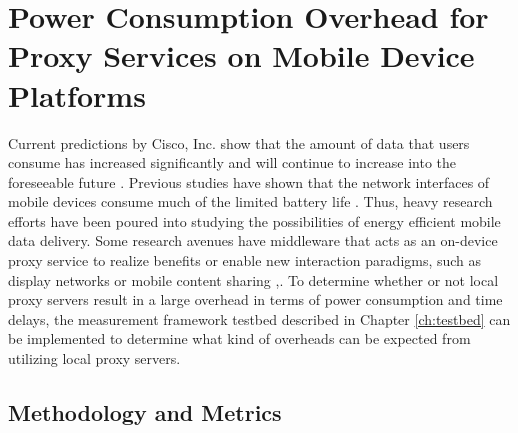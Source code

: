 \chapter{Power Consumption Overhead for Proxy Services on Mobile Device Platforms}

Current predictions by Cisco, Inc. show that the amount of data that users consume has increased significantly and will continue to increase into the foreseeable future \cite{VNI14}. Previous studies have shown that the network interfaces of mobile devices consume much of the limited battery life \cite{Carroll:2010:APC:1855840.1855861}. Thus, heavy research efforts have been poured into studying the possibilities of energy efficient mobile data delivery. Some research avenues have middleware that acts as an on-device proxy service to realize benefits or enable new interaction paradigms, such as display networks \cite{6174992} or mobile content sharing \cite{Seeling:2014:OES:2671189.2671194},\cite{6692468}. To determine whether or not local proxy servers result in a large overhead in terms of power consumption and time delays, the measurement framework testbed described in Chapter \ref{ch:testbed} can be implemented to determine what kind of overheads can be expected from utilizing local proxy servers.

\section*{Methodology and Metrics}

